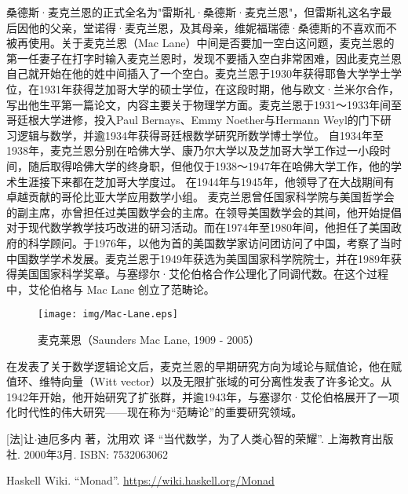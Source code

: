 \documentclass{article}
\begin{document}
桑德斯·麦克兰恩的正式全名为"雷斯礼·桑德斯·麦克兰恩"，但雷斯礼这名字最后因他的父亲，堂诺得·麦克兰恩，及其母亲，维妮福瑞德·桑德斯的不喜欢而不被再使用。关于麦克兰恩（Mac Lane）中间是否要加一空白这问题，麦克兰恩的第一任妻子在打字时输入麦克兰恩时，发现不要插入空白非常困难，因此麦克兰恩自己就开始在他的姓中间插入了一个空白。麦克兰恩于1930年获得耶鲁大学学士学位，在1931年获得芝加哥大学的硕士学位，在这段时期，他与欧文·兰米尔合作，写出他生平第一篇论文，内容主要关于物理学方面。麦克兰恩于1931～1933年间至哥廷根大学进修，投入Paul Bernays、Emmy Noether与Hermann Weyl的门下研习逻辑与数学，并逾1934年获得哥廷根数学研究所数学博士学位。
自1934年至1938年，麦克兰恩分别在哈佛大学、康乃尔大学以及芝加哥大学工作过一小段时间，随后取得哈佛大学的终身职，但他仅于1938～1947年在哈佛大学工作，他的学术生涯接下来都在芝加哥大学度过。
在1944年与1945年，他领导了在大战期间有卓越贡献的哥伦比亚大学应用数学小组。
麦克兰恩曾任国家科学院与美国哲学会的副主席，亦曾担任过美国数学会的主席。在领导美国数学会的其间，他开始提倡对于现代数学教学技巧改进的研习活动。而在1974年至1980年间，他担任了美国政府的科学顾问。于1976年，以他为首的美国数学家访问团访问了中国，考察了当时中国数学学术发展。麦克兰恩于1949年获选为美国国家科学院院士，并在1989年获得美国国家科学奖章。与塞缪尔·艾伦伯格合作公理化了同调代数。在这个过程中，艾伦伯格与 Mac Lane 创立了范畴论。

\begin{wrapfigure}{R}{0.3\textwidth}
 \centering
 \texttt{[image: img/Mac-Lane.eps]}
 \captionsetup{labelformat=empty}
 \caption{麦克莱恩（Saunders Mac Lane, 1909 - 2005）}
 \label{fig:Pythagoras}
\end{wrapfigure}

在发表了关于数学逻辑论文后，麦克兰恩的早期研究方向为域论与赋值论，他在赋值环、维特向量（Witt vector）以及无限扩张域的可分离性发表了许多论文。从1942年开始，他开始研究了扩张群，并逾1943年，与塞谬尔·艾伦伯格展开了一项化时代性的伟大研究——现在称为“范畴论”的重要研究领域。

\ifx\wholebook\relax \else
\begin{thebibliography}{99}

[法]让$\cdot$迪厄多内 著，沈用欢 译 ``当代数学，为了人类心智的荣耀''. 上海教育出版社. 2000年3月. ISBN: 7532063062

Haskell Wiki. ``Monad''. \url{https://wiki.haskell.org/Monad}

\end{thebibliography}

\expandafter\enddocument

\fi
\end{document}
